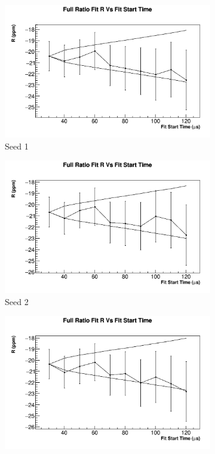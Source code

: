 		\begin{figure}[]
		\centering
		    \begin{subfigure}[t]{0.45\textwidth}
			    \centering
				\includegraphics[width=\textwidth]{RatioCBO_R_FS_canv-Seed0}
			    \caption{Seed 1}
		    \end{subfigure}
		    \begin{subfigure}[t]{0.45\textwidth}
			    \centering
				\includegraphics[width=\textwidth]{RatioCBO_R_FS_canv-Seed1}
			    \caption{Seed 2}
		    \end{subfigure}%
		    \vspace{4mm}
		    \begin{subfigure}[t]{0.45\textwidth}
			    \centering
				\includegraphics[width=\textwidth]{RatioCBO_R_FS_canv-Seed2}

\end{subfigure}
\end{figure}
